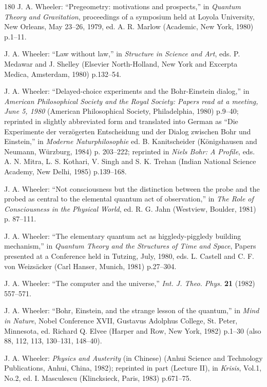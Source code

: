 \documentclass[11pt]{article}
\begin{document}
\begin{thebibliography}{180}
		J. A. Wheeler: ``Pregeometry: motivations and prospects,'' in \emph{Quantum Theory and Gravitation}, proceedings of a symposium held at Loyola University, New Orleans, May 23--26, 1979, ed. A. R. Marlow (Academic, New York, 1980) p.1--11.
		
		J. A. Wheeler: ``Law without law,'' in \emph{Structure in Science and Art}, eds. P. Medawar and J. Shelley (Elsevier North-Holland, New York and Excerpta Medica, Amsterdam, 1980) p.132--54.
		
		J. A. Wheeler: ``Delayed-choice experiments and the Bohr-Einstein dialog,'' in \emph{American Philosophical Society and the Royal Society: Papers read at a meeting, June 5, 1980} (American Philosophical Society, Philadelphia, 1980) p.9--40; reprinted in slightly abbreviated form and translated into German as ``Die Experimente der verzögerten Entscheidung und der Dialog zwischen Bohr und Einstein,'' in \emph{Moderne Naturphilosophie} ed. B. Kanitscheider (Königshausen and Neumann, Würzburg, 1984) p. 203--222; reprinted in \emph{Niels Bohr: A Profile}, eds. A. N. Mitra, L. S. Kothari, V. Singh and S. K. Trehan (Indian National Science Academy, New Delhi, 1985) p.139--168.
		
		J. A. Wheeler: ``Not consciousness but the distinction between the probe and the probed as central to the elemental quantum act of observation,'' in \emph{The Role of Consciousness in the Physical World}, ed. R. G. Jahn (Westview, Boulder, 1981) p. 87--111.
		
		J. A. Wheeler: ``The elementary quantum act as higgledy-piggledy building mechanism,'' in \emph{Quantum Theory and the Structures of Time and Space}, Papers presented at a Conference held in Tutzing, July, 1980, eds. L. Castell and C. F. von Weizsäcker (Carl Hanser, Munich, 1981) p.27--304.
		
		J. A. Wheeler: ``The computer and the universe,'' \emph{Int. J. Theo. Phys.} \textbf{21} (1982) 557--571.
		
		J. A. Wheeler: ``Bohr, Einstein, and the strange lesson of the quantum,'' in \emph{Mind in Nature}, Nobel Conference XVII, Gustavus Adolphus College, St. Peter, Minnesota, ed. Richard Q. Elvee (Harper and Row, New York, 1982) p.1--30 (also 88, 112, 113, 130--131, 148--40).
		
		J. A. Wheeler: \emph{Physics and Austerity} (in Chinese) (Anhui Science and Technology Publications, Anhui, China, 1982); reprinted in part (Lecture II), in \emph{Krisis}, Vol.1, No.2, ed. I. Masculescu (Klincksieck, Paris, 1983) p.671--75.
		

\end{thebibliography}
\end{document}
